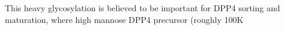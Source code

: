 This heavy glycosylation is believed to be important for DPP4 sorting and maturation, where high mannose DPP4 precursor (roughly 100K \cite{Matter_1991}